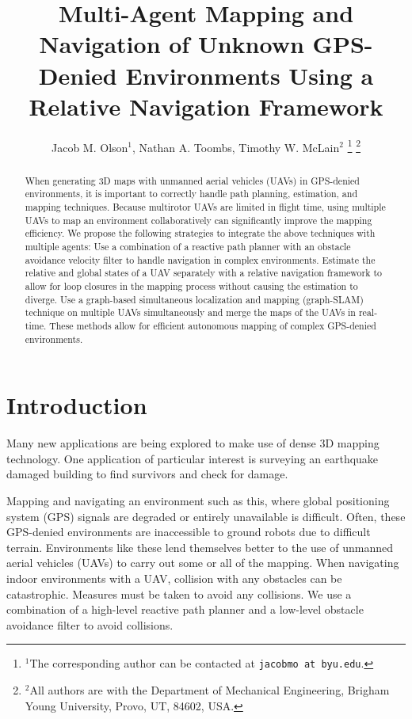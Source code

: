 \documentclass[letterpaper, 10 pt, conference]{ieeeconf}  %
\title{\LARGE \bf
Multi-Agent Mapping and Navigation of Unknown GPS-Denied Environments Using a Relative Navigation Framework}
\author{Jacob M. Olson$^{1}$, Nathan A. Toombs, Timothy W. McLain$^{2}$%
\thanks{$^{1}$The corresponding author can be contacted at
        {\tt\small jacobmo at byu.edu}.}%
\thanks{$^{2}$All authors are with the Department of Mechanical Engineering,
        Brigham Young University, Provo, UT, 84602, USA.}%
}
\begin{document}
\maketitle
\thispagestyle{empty}
\pagestyle{empty}


\begin{abstract}

When generating 3D maps with unmanned aerial vehicles (UAVs) in GPS-denied environments, it is important to correctly handle path planning, estimation, and mapping techniques. Because multirotor UAVs are limited in flight time, using multiple UAVs to map an environment collaboratively can significantly improve the mapping efficiency. We propose the following strategies to integrate the above techniques with multiple agents: Use a combination of a reactive path planner with an obstacle avoidance velocity filter to handle navigation in complex environments. Estimate the relative and global states of a UAV separately with a relative navigation framework to allow for loop closures in the mapping process without causing the estimation to diverge. Use a graph-based simultaneous localization and mapping (graph-SLAM) technique on multiple UAVs simultaneously and merge the maps of the UAVs in real-time. These methods allow for efficient autonomous mapping of complex GPS-denied environments.

\end{abstract}

\section{Introduction}

Many new applications are being explored to make use of dense 3D mapping technology. One application of particular interest is surveying an earthquake damaged building to find survivors and check for damage.

Mapping and navigating an environment such as this, where global positioning system (GPS) signals are degraded or entirely unavailable is difficult. Often, these GPS-denied environments are inaccessible to ground robots due to difficult terrain. Environments like these lend themselves better to the use of unmanned aerial vehicles (UAVs) to carry out some or all of the mapping. When navigating indoor environments with a UAV, collision with any obstacles can be catastrophic. Measures must be taken to avoid any collisions. We use a combination of a high-level reactive path planner and a low-level obstacle avoidance filter to avoid collisions.
\end{document}
